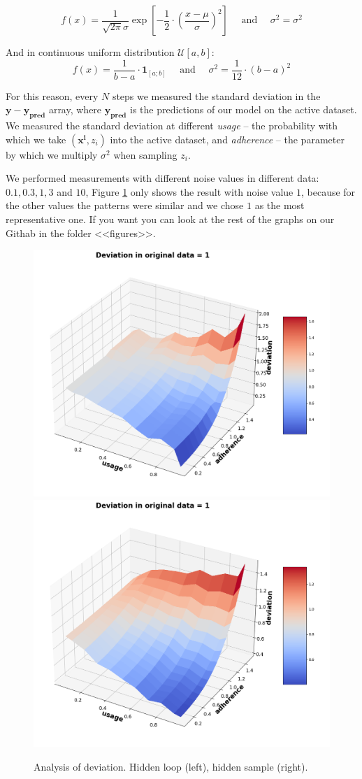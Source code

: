 \documentclass{article}
\begin{document}
        \begin{equation*}
            f(x) = \dfrac{1}{\sqrt{2 \pi} \sigma} \exp\left[-\dfrac{1}{2} \cdot \left(\dfrac{x - \mu}{\sigma}\right)^2\right] \quad \text{ and } \quad \sigma^2 = \sigma^2
        \end{equation*}

        And in continuous uniform distribution $\mathcal{U}[a, b]$:
        \begin{equation*}
            f(x) = \dfrac{1}{b-a} \cdot \textbf{1}_{[a;b]} \quad \text{ and } \quad \sigma^2 = \dfrac{1}{12} \cdot (b-a)^2
        \end{equation*}

        For this reason, every $N$ steps we measured the standard deviation in the $\mathbf{y} - \mathbf{y_{\text{pred}}}$ array, where $\mathbf{y_{\text{pred}}}$ is the predictions of our model on the active dataset. We measured the standard deviation at different \textit{usage} -- the probability with which we take $(\mathbf{x^i}, z_i)$ into the active dataset, and \textit{adherence} -- the parameter by which we multiply $\sigma^2$ when sampling $z_i$. 

        We performed measurements with different noise values in different data: $0.1, 0.3, 1, 3$ and $10$, Figure \ref{3D} only shows the result with noise value $1$, because for the other values the patterns were similar and we chose $1$ as the most representative one. If you want you can look at the rest of the graphs on our Githab in the folder <<figures>>.

        \begin{figure}[h!]
            \centering
            \includegraphics[width=0.49\linewidth]{pictures/3D_plot_loop_1.png}
            \includegraphics[width=0.49\linewidth]{pictures/3D_plot_sample_1.png}
            
            \caption{Analysis of deviation. Hidden loop (left), hidden sample (right).}
            \label{3D}
        \end{figure}
\end{document}
